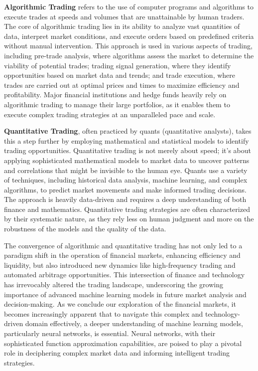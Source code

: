 \textbf{Algorithmic Trading} refers to the use of computer programs and algorithms to execute trades at speeds and volumes that are unattainable by human traders. The core of algorithmic trading lies in its ability to analyze vast quantities of data, interpret market conditions, and execute orders based on predefined criteria without manual intervention. This approach is used in various aspects of trading, including pre-trade analysis, where algorithms assess the market to determine the viability of potential trades; trading signal generation, where they identify opportunities based on market data and trends; and trade execution, where trades are carried out at optimal prices and times to maximize efficiency and profitability. Major financial institutions and hedge funds heavily rely on algorithmic trading to manage their large portfolios, as it enables them to execute complex trading strategies at an unparalleled pace and scale.

\textbf{Quantitative Trading}, often practiced by quants (quantitative analysts), takes this a step further by employing mathematical and statistical models to identify trading opportunities. Quantitative trading is not merely about speed; it's about applying sophisticated mathematical models to market data to uncover patterns and correlations that might be invisible to the human eye. Quants use a variety of techniques, including historical data analysis, machine learning, and complex algorithms, to predict market movements and make informed trading decisions. The approach is heavily data-driven and requires a deep understanding of both finance and mathematics. Quantitative trading strategies are often characterized by their systematic nature, as they rely less on human judgment and more on the robustness of the models and the quality of the data.

The convergence of algorithmic and quantitative trading has not only led to a paradigm shift in the operation of financial markets, enhancing efficiency and liquidity, but also introduced new dynamics like high-frequency trading and automated arbitrage opportunities. This intersection of finance and technology has irrevocably altered the trading landscape, underscoring the growing importance of advanced machine learning models in future market analysis and decision-making. As we conclude our exploration of the financial markets, it becomes increasingly apparent that to navigate this complex and technology-driven domain effectively, a deeper understanding of machine learning models, particularly neural networks, is essential. Neural networks, with their sophisticated function approximation capabilities, are poised to play a pivotal role in deciphering complex market data and informing intelligent trading strategies.

